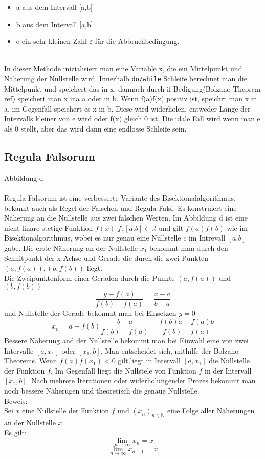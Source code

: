 \begin{itemize}
\item a aus dem Intervall [a,b]
\item b aus dem Intervall [a,b]
\item e ein sehr kleinen Zahl $\varepsilon$ für die Abbruchbedingung.
\end{itemize}
 \\
In dieser Methode inizialisiert man eine Variable x, die ein Mittelpunkt und Näherung der Nullstelle wird. Innerhalb \verb|do/while| Schleife berechnet man die Mittelpunkt und speichert das in x. dannach durch if Bedigung(Bolzano Theorem ref) speichert man x ina a oder in b. Wenn f(a)f(x) positiv ist, speichrt man x in a. im Gegenfall speichert es x in b. Diese wird widerholen, entweder Länge der Intervalls kleiner von e wird oder f(x) gleich 0 ist. Die idale Fall wird wenn man e als 0 stellt, aber das wird dann eine endlosse Schleife sein.




\subsection{Regula Falsorum}
Abbildung d\\
\\
Regula Falsorum ist eine verbesserte Variante des Bisektionalalgorithmus, bekannt auch als Regel der Falschen und Regula Falsi. Es konstruiert eine Näherung an die Nullstelle aus zwei falschen Werten.
Im Abbildung d ist eine nicht linare stetige Funktion $f(x)$ $f: [a.b] \in \mathbb{R}$ und gilt $f(a)f(b)$ wie im Bisektionalgorithmus, wobei es nur genau eine Nullstelle $c$ im Intrevall $[a.b]$ gabe.
Die erste Näherung an der Nullstelle $x_1$ bekommt man durch den Schnitpunkt der x-Achse und Gerade die durch die zwei Punkten$(a,f(a)),(b,f(b))$ liegt.\\
Die Zweipunktenform einer Geraden durch die Punkte $(a,f(a))$ und $(b,f(b))$
$$\frac{y-f(a)}{f(b)-f(a)}= \frac{x-a}{b-a}$$
und Nullstelle der Gerade bekommt man bei Einsetzen $y=0$
$$x_n = a - f(b)\frac{b - a}{f(b)-  f(a)} = \frac{f(b)a - f(a)b}{f(b) - f(a)}$$
Bessere Näherung and der Nullstelle bekommt man bei Einwahl eine von zwei Intervalle $[a,x_1] $ oder $[x_1, b]$. Man entscheidet sich, mithilfe der Bolzano Theorems. Wenn $f(a)f(x_1) < 0$ gilt,liegt in Intervall $[a,x_1]$ die Nullstelle der Funktion $f$. Im Gegenfall liegt die Nullstele von Funktion $f$ in der Intervall $[x_1,b]$. Nach mehrere Iterationen oder widerholungender Prozes bekommt man noch bessere Näherugen und theoretisch die genaue Nullstelle.\\
Beweis:\\
Sei $x$ eine Nullstelle der Funktion $f$ und $(x_n)_{n \in \mathbb{N}}$ eine Folge aller Näherungen an der Nullstelle $x$\\
Es gilt: 
$$ \lim_{n \to \infty}x_n = x$$
$$ \lim_{n \to \infty}x_{n-1} = x$$

